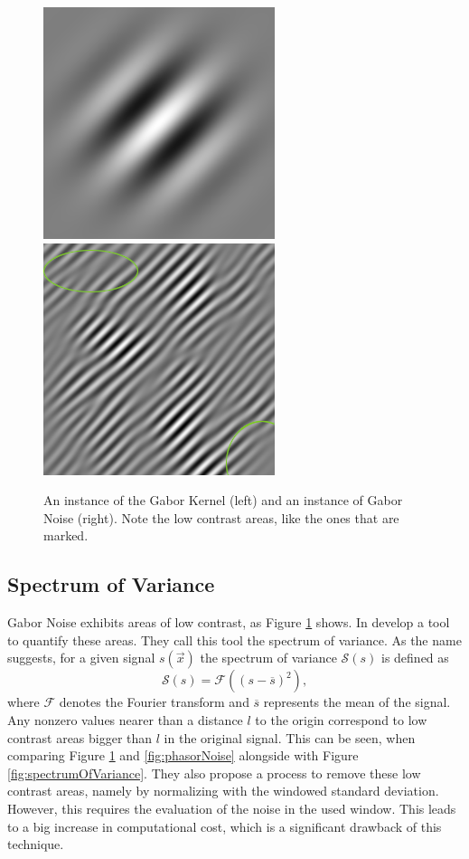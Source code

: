 \documentclass{utue} %
\begin{document}
\begin{figure}[ht]
  \centering
  \includegraphics[width=0.49\linewidth]{images/gaborKernel}
  \includegraphics[width=0.49\linewidth]{images/gaborNoise}
  \caption{An instance of the Gabor Kernel (left) and an instance of Gabor Noise (right). Note the low contrast areas, like the ones that are marked.}\label{fig:gaborNoise}

\end{figure}

\subsection{Spectrum of Variance}
Gabor Noise exhibits areas of low contrast, as Figure \ref{fig:gaborNoise} shows. In \cite{spectrumOfVariance} \citeauthor{spectrumOfVariance} develop a tool to quantify these areas. They call this tool the spectrum of variance. As the name suggests, for a given signal $s(\vec{x})$ the spectrum of variance $\mathcal{S}(s)$ is defined as
$$
\mathcal{S}(s) = \mathcal{F}((s-\overline{s})^2),
$$
where $\mathcal{F}$ denotes the Fourier transform and $\overline{s}$ represents the mean of the signal. Any nonzero values nearer than a distance $l$ to the origin correspond to low contrast areas bigger than $l$ in the original signal. This can be seen, when comparing Figure \ref{fig:gaborNoise} and \ref{fig:phasorNoise} alongside with Figure \ref{fig:spectrumOfVariance}. They also propose a process to remove these low contrast areas, namely by normalizing with the windowed standard deviation. However, this requires the evaluation of the noise in the used window. This leads to a big increase in computational cost, which is a significant drawback of this technique.
\end{document}
